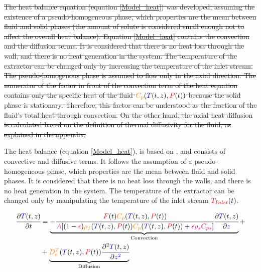 \documentclass[../Article_Model_Parameters.tex]{subfiles}
\begin{document}
		\sout{The heat balance equation (equation  \ref{Model_heat}) was developed, assuming the existence of a pseudo-homogeneous phase, which properties are the mean between fluid and solid phases (the amount of solute is considered small enough not to affect the overall heat balance). Equation \ref{Model_heat} contains the convection and the diffusion terms. It is considered that there is no heat loss through the wall, and there is no heat generation in the system. The temperature of the extractor can be changed only by increasing the temperature of the inlet stream. The pseudo-homogenous phase is assumed to flow only in the axial direction. The numerator of the factor in front of the convection term of the heat equation contains only the specific heat of the fluid ${\color{orange}C_p}({\color{blue}T}(t,z),{\color{red}P}(t))$ because the solid phase is stationary. Therefore, this factor can be understood as the fraction of the fluid's total heat through convection. On the other hand, the axial heat diffusion is calculated based on the definition of thermal diffusivity for the fluid, as explained in the appendix. }
			
		{\color{blue} The heat balance (equation \ref{Model_heat}), is based on \citet{Srinivasan2012}, and consists of convective and diffusive terms. It follows the assumption of a pseudo-homogeneous phase, which properties are the mean between fluid and solid phases. It is considered that there is no heat loss through the walls, and there is no heat generation in the system. The temperature of the extractor can be changed only by manipulating the temperature of the inlet stream ${\color{red}T_{Inlet}}(t)$.
			}
			
			{\footnotesize
				\begin{equation} \label{Model_heat}
					\begin{split}
						\cfrac{\partial {\color{blue}T}(t,z)}{\partial t} &= 
						\underbrace{ -\cfrac{{\color{red}F}(t) {\color{orange}C_p}({\color{blue}T}(t,z),{\color{red}P}(t))}{{\color{magenta}A} 	[(1-{\color{magenta}\epsilon}){\color{orange}\rho_f}({\color{blue}T}(t,z),{\color{red}P}(t)) {\color{orange}C_p} ({\color{blue}T}(t,z),{\color{red}P}(t)) + {\color{magenta} \epsilon \rho_s C_{ps} } ]} \cfrac{\partial {\color{blue}T}(t,z)}{\partial {\color{blue}z}}  }_{\text{Convection}} + \\
						& + \underbrace{ {\color{orange}D^T_e}({\color{blue}T}(t,z),{\color{red}P}(t)) \cfrac{\partial^2 {\color{blue}T}(t,z)}{\partial {\color{blue}z^2}} }_{\text{Diffusion}}
					\end{split}
			\end{equation} }
			
\end{document}

